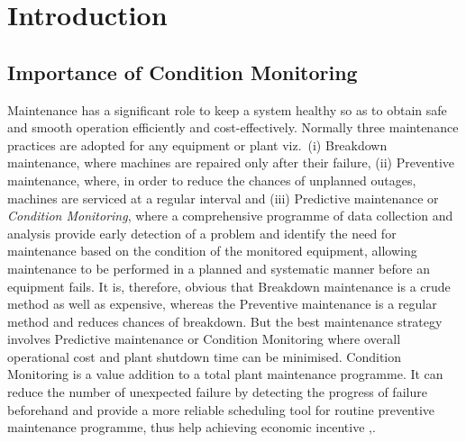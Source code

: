 \documentclass[a4paper,11pt]{report}
\begin{document}
\chapter{Introduction}

\section{Importance of Condition Monitoring}
Maintenance has a significant role to keep a system healthy so as to obtain safe and smooth operation efficiently and cost-effectively. Normally three maintenance practices are adopted for any equipment or plant viz.~(i) Breakdown maintenance, where machines are repaired only after their failure, (ii) Preventive maintenance, where, in order to reduce the chances of unplanned outages, machines are serviced at a regular interval and (iii) Predictive maintenance or \emph{Condition Monitoring}, where a comprehensive programme of data collection and analysis provide early detection of a problem and identify the need for maintenance based on the condition of the monitored equipment, allowing maintenance to be performed in a planned and systematic manner before an equipment fails. It is, therefore, obvious that Breakdown maintenance is a crude method as well as expensive, whereas the Preventive maintenance is a regular method and reduces chances of breakdown. But the best maintenance strategy involves Predictive maintenance or Condition Monitoring where overall operational cost and plant shutdown time can be minimised. Condition Monitoring is a value addition to a total plant maintenance programme. It can reduce the number of unexpected failure by detecting the progress of failure beforehand and provide a more reliable scheduling tool for routine preventive maintenance programme, thus help achieving economic incentive \cite{Penman},\cite{rps1}. 
\end{document}
